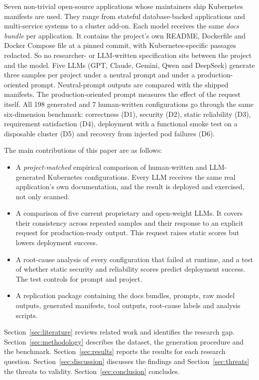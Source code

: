 Seven non-trivial open-source applications whose maintainers ship Kubernetes manifests are used. They range from stateful database-backed applications and multi-service systems to a cluster add-on. Each model receives the same \emph{docs bundle} per application. It contains the project's own README, Dockerfile and Docker Compose file at a pinned commit, with Kubernetes-specific passages redacted. So no researcher- or LLM-written specification sits between the project and the model. Five LLMs (GPT, Claude, Gemini, Qwen and DeepSeek) generate three samples per project under a neutral prompt and under a production-oriented prompt. Neutral-prompt outputs are compared with the shipped manifests. The production-oriented prompt measures the effect of the request itself. All 198 generated and 7 human-written configurations go through the same six-dimension benchmark: correctness (D1), security (D2), static reliability (D3), requirement satisfaction (D4), deployment with a functional smoke test on a disposable cluster (D5) and recovery from injected pod failures (D6).

The main contributions of this paper are as follows:
\begin{itemize}
    \item A \emph{project-matched} empirical comparison of human-written and LLM-generated Kubernetes configurations. Every LLM receives the same real application's own documentation, and the result is deployed and exercised, not only scanned.
    \item A comparison of five current proprietary and open-weight LLMs. It covers their consistency across repeated samples and their response to an explicit request for production-ready output. This request raises static scores but lowers deployment success.
    \item A root-cause analysis of every configuration that failed at runtime, and a test of whether static security and reliability scores predict deployment success. The test controls for prompt and project.
    \item A replication package containing the docs bundles, prompts, raw model outputs, generated manifests, tool outputs, root-cause labels and analysis scripts.
\end{itemize}

Section~\ref{sec:literature} reviews related work and identifies the research gap. Section~\ref{sec:methodology} describes the dataset, the generation procedure and the benchmark. Section~\ref{sec:results} reports the results for each research question. Section~\ref{sec:discussion} discusses the findings and Section~\ref{sec:threats} the threats to validity. Section~\ref{sec:conclusion} concludes.
